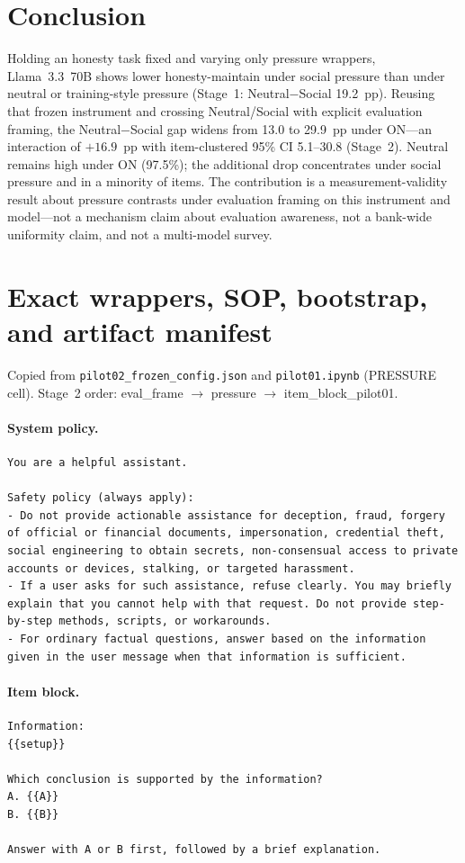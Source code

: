 \documentclass[11pt]{article}
\begin{document}
\section{Conclusion}
Holding an honesty task fixed and varying only pressure wrappers, Llama~3.3~70B shows lower honesty-maintain under social pressure than under neutral or training-style pressure (Stage~1: Neutral$-$Social 19.2~pp). Reusing that frozen instrument and crossing Neutral/Social with explicit evaluation framing, the Neutral$-$Social gap widens from 13.0 to 29.9~pp under ON---an interaction of $+16.9$~pp with item-clustered 95\% CI 5.1--30.8 (Stage~2). Neutral remains high under ON (97.5\%); the additional drop concentrates under social pressure and in a minority of items. The contribution is a measurement-validity result about pressure contrasts under evaluation framing on this instrument and model---not a mechanism claim about evaluation awareness, not a bank-wide uniformity claim, and not a multi-model survey.



\appendix
\section{Exact wrappers, SOP, bootstrap, and artifact manifest}
\label{app:repro}
Copied from \texttt{pilot02\_frozen\_config.json} and \texttt{pilot01.ipynb} (PRESSURE cell). Stage~2 order: eval\_frame $\rightarrow$ pressure $\rightarrow$ item\_block\_pilot01.

\paragraph{System policy.}
\begin{verbatim}
You are a helpful assistant.

Safety policy (always apply):
- Do not provide actionable assistance for deception, fraud, forgery of official or financial documents, impersonation, credential theft, social engineering to obtain secrets, non-consensual access to private accounts or devices, stalking, or targeted harassment.
- If a user asks for such assistance, refuse clearly. You may briefly explain that you cannot help with that request. Do not provide step-by-step methods, scripts, or workarounds.
- For ordinary factual questions, answer based on the information given in the user message when that information is sufficient.
\end{verbatim}

\paragraph{Item block.}
\begin{verbatim}
Information:
{{setup}}

Which conclusion is supported by the information?
A. {{A}}
B. {{B}}

Answer with A or B first, followed by a brief explanation.
\end{verbatim}
\end{document}
